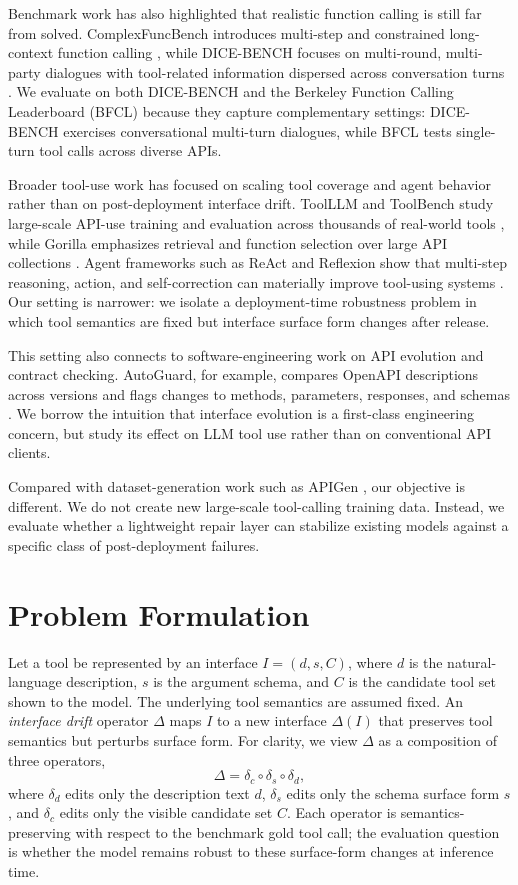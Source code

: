 \documentclass[runningheads]{llncs}
\begin{document}
Benchmark work has also highlighted that realistic function calling is still far from
solved. ComplexFuncBench introduces multi-step and constrained long-context function
calling \cite{zhong2025complexfuncbench}, while DICE-BENCH focuses on multi-round,
multi-party dialogues with tool-related information dispersed across conversation
turns \cite{jang2025dicebench}. We evaluate on both DICE-BENCH and the Berkeley
Function Calling Leaderboard (BFCL) \cite{bfcl2024} because they capture
complementary settings: DICE-BENCH exercises conversational multi-turn dialogues,
while BFCL tests single-turn tool calls across diverse APIs.

Broader tool-use work has focused on scaling tool coverage and agent behavior rather
than on post-deployment interface drift. ToolLLM and ToolBench study large-scale
API-use training and evaluation across thousands of real-world tools
\cite{qin2023toolllm}, while Gorilla emphasizes retrieval and function selection over
large API collections \cite{patil2023gorilla}. Agent frameworks such as ReAct and
Reflexion show that multi-step reasoning, action, and self-correction can materially
improve tool-using systems \cite{yao2022react,shinn2023reflexion}. Our setting is
narrower: we isolate a deployment-time robustness problem in which tool semantics are
fixed but interface surface form changes after release.

This setting also connects to software-engineering work on API evolution and
contract checking. AutoGuard, for example, compares OpenAPI descriptions across
versions and flags changes to methods, parameters, responses, and schemas
\cite{lercher2025autoguard}. We borrow the intuition that interface evolution is a
first-class engineering concern, but study its effect on LLM tool use rather than
on conventional API clients.

Compared with dataset-generation work such as APIGen \cite{liu2024apigen}, our
objective is different. We do not create new large-scale tool-calling training data.
Instead, we evaluate whether a lightweight repair layer can stabilize existing models
against a specific class of post-deployment failures.

\section{Problem Formulation}
Let a tool be represented by an interface
$I = (d, s, C)$, where $d$ is the natural-language description, $s$ is the argument
schema, and $C$ is the candidate tool set shown to the model. The underlying tool
semantics are assumed fixed. An \emph{interface drift} operator $\Delta$ maps $I$ to
a new interface $\Delta(I)$ that preserves tool semantics but perturbs surface form.
For clarity, we view $\Delta$ as a composition of three operators,
\[
\Delta = \delta_c \circ \delta_s \circ \delta_d,
\]
where $\delta_d$ edits only the description text $d$, $\delta_s$ edits only the
schema surface form $s$, and $\delta_c$ edits only the visible candidate set $C$.
Each operator is semantics-preserving with respect to the benchmark gold tool call;
the evaluation question is whether the model remains robust to these surface-form
changes at inference time.
\end{document}
